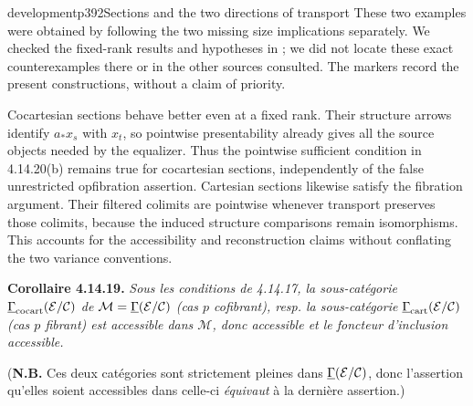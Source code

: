 \begin{dcomment}{development}{p392}{Sections and the two directions of transport}
These two examples were obtained by following the two missing size implications separately. We checked the fixed-rank results and hypotheses in \citet{Positselski2024Limits}; we did not locate these exact counterexamples there or in the other sources consulted. The markers record the present constructions, without a claim of priority.

Cocartesian sections behave better even at a fixed rank. Their structure arrows identify $a_*x_s$ with $x_t$, so pointwise presentability already gives all the source objects needed by the equalizer. Thus the pointwise sufficient condition in 4.14.20(b) remains true for cocartesian sections, independently of the false unrestricted opfibration assertion. Cartesian sections likewise satisfy the fibration argument. Their filtered colimits are pointwise whenever transport preserves those colimits, because the induced structure comparisons remain isomorphisms. This accounts for the accessibility and reconstruction claims without conflating the two variance conventions.
\end{dcomment}


\textbf{Corollaire 4.14.19.} \textit{Sous les conditions de 4.14.17, la sous-catégorie $\underline{\Gamma}_{\mathrm{cocart}}(\mathcal{E}/\mathcal{C})$ de $\mathcal{M} = \underline{\Gamma}(\mathcal{E}/\mathcal{C})$ (cas $p$ cofibrant), resp. la sous-catégorie $\underline{\Gamma}_{\mathrm{cart}}(\mathcal{E}/\mathcal{C})$ (cas $p$ fibrant) est accessible dans $\mathcal{M}$, donc accessible et le foncteur d’inclusion} \textit{accessible.}

(\textbf{N.B.} Ces deux catégories sont strictement pleines dans $\underline{\Gamma}(\mathcal{E}/\mathcal{C})$, donc l’assertion qu’elles soient accessibles dans celle-ci \textit{équivaut} à la dernière assertion.)

